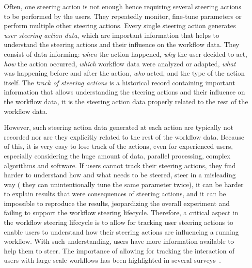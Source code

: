 Often, one steering action is not enough hence requiring several steering actions to be performed by the users. They repeatedly monitor, fine-tune parameters or perform multiple other steering actions.
Every single steering action generates \textit{user steering action data}, which are important information that helps to understand the steering actions and their influence on the workflow data. They consist of data informing: \textit{when} the action happened, \textit{why} the user decided to act, \textit{how} the action occurred, \textit{which} workflow data were analyzed or adapted, \textit{what} was happening before and after the action, \textit{who} acted, and the type of the action itself. The \textit{track of steering actions} is a historical record containing important information that allows understanding the steering actions and their influence on the workflow data, \ie{} it is the steering action data properly related to the rest of the workflow data.

However, such steering action data generated at each action are typically not recorded nor are they explicitly related to the rest of the workflow data. 
Because of this, it is very easy to lose track of the actions, even for experienced users,
especially considering the huge amount of data, parallel processing, complex algorithms and software.
If users cannot track their steering actions, they find harder to understand how and what needs to be steered, steer in a misleading way (\eg{} they can unintentionally tune the same parameter twice), it can be harder to explain results that were consequences of steering actions, and it can be impossible to reproduce the results, jeopardizing the overall experiment and failing to support the workflow steering lifecycle. 
Therefore, a critical aspect in the workflow steering lifecycle is to allow for tracking user steering actions to enable users to understand how their steering actions are influencing a running workflow. With such understanding, users have more information available to help them to steer.
The importance of allowing for tracking the interaction of users with large-scale workflows has been highlighted in several surveys~\cite{deelman_future_2017,F.daSilva2017characterization,Atkinson2017Scientific,Netto2018HPC}.

